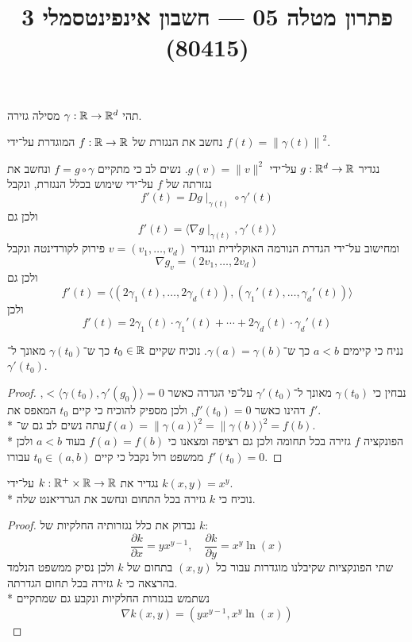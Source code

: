 
\title{פתרון מטלה 05 --- חשבון אינפינטסמלי 3 (80415)}


\maketitle
\maketitleprint{}

\Question{}
תהי $\gamma : \mathbb{R} \to \mathbb{R}^d$ מסילה גזירה.

\Subquestion{}
נחשב את הנגזרת של $f : \mathbb{R} \to \mathbb{R}$ המוגדרת על־ידי $f(t) = {\lVert \gamma(t)\rVert}^2$.

נגדיר $g : \mathbb{R}^d \to \mathbb{R}$ על־ידי $g(v) = \lVert v \rVert^2$.
נשים לב כי מתקיים $f = g \circ \gamma$ ונחשב את נגזרתה של $f$ על־ידי שימוש בכלל הנגזרת, ונקבל
\[
	f'(t) = Dg\mid_{\gamma(t)} \circ \gamma'(t)
\]
ולכן גם
\[
	f'(t) = \langle \nabla g \mid_{\gamma(t)}, \gamma'(t) \rangle
\]
ומחישוב על־ידי הגדרת הנורמה האוקלידית ונגדיר $v = (v_1, \dots, v_d)$ פירוק לקורדינטה ונקבל
\[
	\nabla g_v = (2v_1, \dots, 2v_d)
\]
ולכן גם
\[
	f'(t) = \langle (2 \gamma_1(t), \dots, 2 \gamma_d(t)), (\gamma_1'(t), \dots, \gamma_d'(t)) \rangle
\]
ולכן
\[
	f'(t) = 2\gamma_1(t) \cdot \gamma_1'(t) + \cdots + 2\gamma_d(t) \cdot \gamma_d'(t)
\]

\Subquestion{}
נניח כי קיימים $a < b$ כך ש־$\gamma(a) = \gamma(b)$.
נוכיח שקיים $t_0 \in \mathbb{R}$ כך ש־$\gamma(t_0)$ מאונך ל־$\gamma'(t_0)$.
\begin{proof}
	נבחין כי $\gamma(t_0)$ מאונך ל־$\gamma'(t_0)$ על־פי הגדרה כאשר $<\langle \gamma(t_0), \gamma'(g_0) \rangle = 0$, דהינו כאשר $f'(t_0) = 0$, ולכן מספיק להוכיח כי קיים $t_0$ המאפס את $f'$. \\*
	עתה נשים לב גם ש־$f(a) = \lVert \gamma(a) \rangle^2 = \lVert \gamma(b) \rangle^2 = f(b)$. \\*
	הפונקציה $f$ גזירה בכל תחומה ולכן גם רציפה ומצאנו כי $f(a) = f(b)$ בעוד $a < b$ ולכן ממשפט רול נקבל כי קיים $t_0 \in (a, b)$ עבורו $f'(t_0) = 0$.
\end{proof}

\Question{}
נגדיר את $k : \mathbb{R}^+ \times \mathbb{R} \to \mathbb{R}$ על־ידי $k(x, y) = x^y$. \\*
נוכיח כי $k$ גזירה בכל התחום ונחשב את הגרדיאנט שלה.
\begin{proof}
	נבדוק את כלל נגזרותיה החלקיות של $k$:
	\[
		\frac{\partial k}{\partial x} = y x^{y - 1},
		\quad
		\frac{\partial k}{\partial y} = x^y \ln(x)
	\]
	שתי הפונקציות שקיבלנו מוגדרות עבור כל $(x, y)$ בתחום של $k$ ולכן נסיק ממשפט הנלמד בהרצאה כי $k$ גזירה בכל תחום הגדרתה. \\*
	נשתמש בנגזרות החלקיות ונקבע גם שמתקיים
	\[
		\nabla k(x, y) = (yx^{y - 1}, x^y \ln(x))
	\]
\end{proof}

